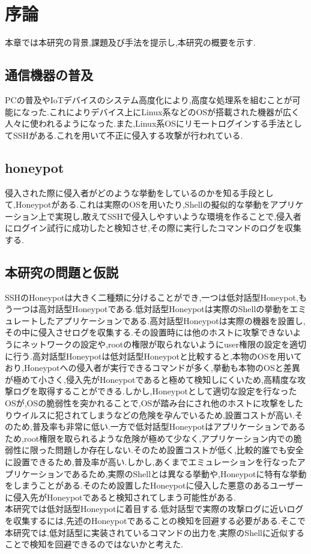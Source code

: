 \chapter{序論}
\label{intr}

本章では本研究の背景,課題及び手法を提示し,本研究の概要を示す.

\section{通信機器の普及}
\label{intr:back}
PCの普及やIoTデバイスのシステム高度化により,高度な処理系を組むことが可能になった.これによりデバイス上にLinux系などのOSが搭載された機器が広く人々に使われるようになった.また,Linux系OSにリモートログインする手法としてSSHがある.これを用いて不正に侵入する攻撃が行われている.

\section{honeypot}
\label{intr:honey}
 侵入された際に侵入者がどのような挙動をしているのかを知る手段として,Honeypotがある.これは実際のOSを用いたり,Shellの擬似的な挙動をアプリケーション上で実現し,敢えてSSHで侵入しやすいような環境を作ることで,侵入者にログイン試行に成功したと検知させ,その際に実行したコマンドのログを収集する.

\section{本研究の問題と仮説}
\label{intr:prob}
SSHのHoneypotは大きく二種類に分けることができ,一つは低対話型Honeypot,もう一つは高対話型Honeypotである.低対話型Honeypotは実際のShellの挙動をエミュレートしたアプリケーションである.高対話型Honeypotは実際の機器を設置し,その中に侵入させログを収集する.その設置時には他のホストに攻撃できないようにネットワークの設定や,rootの権限が取られないようにuser権限の設定を適切に行う.高対話型Honeypotは低対話型Honeypotと比較すると,本物のOSを用いており,Honeypotへの侵入者が実行できるコマンドが多く,挙動も本物のOSと差異が極めて小さく,侵入先がHoneypotであると極めて検知しにくいため,高精度な攻撃ログを取得することができる.しかし,Honeypotとして適切な設定を行なったOSが,OSの脆弱性を突かれることで,OSが踏み台にされ他のホストに攻撃をしたりウイルスに犯されてしまうなどの危険を孕んでいるため,設置コストが高い.そのため,普及率も非常に低い\cite{HighIntHoney}.一方で低対話型Honeypotはアプリケーションであるため,root権限を取られるような危険が極めて少なく,アプリケーション内での脆弱性に限った問題しか存在しない.そのため設置コストが低く,比較的誰でも安全に設置できるため,普及率が高い.しかし,あくまでエミュレーションを行なったアプリケーションであるため,実際のShellとは異なる挙動や,Honeypotに特有な挙動をしまうことがある.そのため設置したHoneypotに侵入した悪意のあるユーザーに侵入先がHoneypotであると検知されてしまう可能性がある.\\
本研究では低対話型Honeypotに着目する.低対話型で実際の攻撃ログに近いログを収集するには,先述のHoneypotであることの検知を回避する必要がある.そこで本研究では,低対話型に実装されているコマンドの出力を,実際のShellに近似することで検知を回避できるのではないかと考えた.

